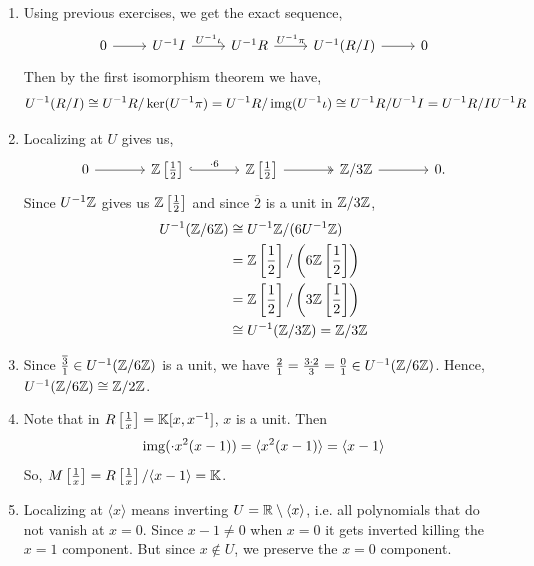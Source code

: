 \documentclass[Notebook.tex]{subfiles}
\begin{document}
\begin{solution}
    \bbni
    \begin{enumerate}
        \item Using previous exercises, we get the exact sequence, 
        \[\begin{tikzcd} 0 \arrow[r] & U^{-1}I \arrow[r, "U^{-1}\iota"] & U^{-1}R \arrow[r, "U^{-1}\pi"] & U^{-1}(R/I) \arrow[r] & 0 \end{tikzcd}\]
        Then by the first isomorphism theorem we have, 
        \[U^{-1}(R/I) \cong U^{-1}R/\ker(U^{-1}\pi) = U^{-1}R/\operatorname{img}(U^{-1}\iota) \cong U^{-1}R/U^{-1}I = U^{-1}R/IU^{-1}R\]

        \item Localizing at $U$ gives us, 
         \[
        \begin{tikzcd}[column sep=large]
        0 \arrow[r] & \Z\left[\frac{1}{2}\right] \arrow[r, hook, "\cdot 6"] & \Z\left[\frac{1}{2}\right]  \arrow[r, two heads] & \Z/3\Z \arrow[r] & 0.
        \end{tikzcd}
        \]
        Since $U^{-1}\mathbb Z$ gives us $\mathbb Z\left[\frac{1}{2}\right]$ and since $\overline{2}$ is a unit in $\mathbb Z/3\mathbb Z$,
        \begin{align*}
            U^{-1}(\mathbb Z/6\mathbb Z) &\cong U^{-1}\mathbb Z / (6 U^{-1}\mathbb Z) \\
            &= \mathbb Z\left[\frac{1}{2}\right] / \left (6 \mathbb Z\left[\frac{1}{2}\right] \right ) \\
            &= \mathbb Z\left[\frac{1}{2}\right] / \left (3 \mathbb Z\left[\frac{1}{2}\right] \right ) \\
            &\cong U^{-1}(\mathbb Z/3\mathbb Z) = \mathbb Z/3\mathbb Z 
        \end{align*}

        \item Since $\frac{\overline{3}}{1} \in U^{-1}(\mathbb Z/6\mathbb Z)$ is a unit, we have $\frac{2}{1} = \frac{3 \cdot 2}{3} = \frac{0}{1} \in U^{-1}(\mathbb Z/6\mathbb Z)$. Hence, $U^{-1}(\mathbb Z/6\mathbb Z) \cong \mathbb Z/2\mathbb Z$.
        
        \item Note that in $R\left[\tfrac{1}{x}\right] = \mathbb K[x, x^{-1}]$, $x$ is a unit. Then 
        \[\operatorname{img}(\cdot x^2(x-1)) = \langle x^2 (x-1) \rangle = \langle x - 1\rangle\] 
        So, $M\left[\frac{1}{x}\right]  = R \left[\frac{1}{x}\right]/\langle x - 1\rangle = \mathbb K$. 

        \item Localizing at $\langle x \rangle$ means inverting $U = \mathbb R \setminus \langle x \rangle$, i.e. all polynomials that do not vanish at $x = 0$. Since $x-1 \neq 0$ when $x = 0$ it gets inverted killing the $x = 1$ component. But since $ x \notin U$, we preserve the $x = 0 $ component. 
        

\end{enumerate}
\end{solution}
\end{document}
